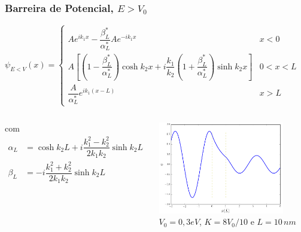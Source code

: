 \documentclass[12pt,brazil,table]{beamer}
\begin{document}
\begin{frame}
  \frametitle{Barreira de Potencial, $E>V_0$}

  \fontsize{8pt}{11pt}\selectfont
  
  \vspace*{-1cm}
  \begin{minipage}[t][20ex][t]{\linewidth}
     $
     \psi_{E < V}(x) =\begin{cases} Ae^{ik_1x}-\dfrac{\beta_L^*}{\alpha_L^*}Ae^{-ik_1x} & x < 0\\
          A\left[ \left( 1-\dfrac{\beta_L^*}{\alpha_L^*} \right)\cosh k_2x+ i\dfrac{k_1}{k_2}\left( 1+ \dfrac{\beta_L^*}{\alpha_L^*}\right)\sinh k_2x\right] & 0 < x < L\\
          \dfrac{A}{\alpha_L^*}e^{ik_1(x-L)} & x > L
          \end{cases}
    $

  \end{minipage}

  
  \vspace*{-0.5cm}
  \begin{minipage}[b][20ex][t]{\linewidth}
  \begin{columns}
   
    
      
    com
     \begin{align*}
            \alpha_L &= \cosh k_2L + i\dfrac{k_1^2-k_2^2}{2k_1k_2}\sinh k_2L\\
            \beta_L &= -i\dfrac{k_1^2+k_2^2}{2k_1k_2}\sinh k_2L
          \end{align*}
    

    
    
    \begin{center}
     \includegraphics[height=4cm]{figuras/fig36}\\
    \fontsize{8pt}{11pt}\selectfont
    $V_0=0,3eV$, $K=8V_0/10$ e $L=10\,nm$
    \end{center}
   
  \end{columns}
  \end{minipage}

\end{frame}
\end{document}
